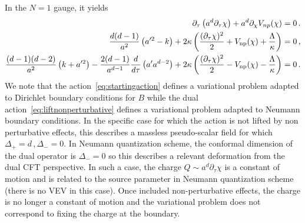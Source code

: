 \documentclass[a4paper]{article}
\begin{document}
In the $N=1$ gauge, it yields
\begin{equation}\label{eq:Nequal1gauge}
  \begin{aligned}
    \partial_\tau\left(a^d\partial_\tau \chi\right)+a^{d}\partial_{\chi}V_{np}(\chi)&=0\,.\\
    \frac{d(d-1)}{a^2}\left(a'^2-k\right)+2\kappa\left(\frac{(\partial_\tau \chi)^2}{2}+V_{\rm np}(\chi)+\frac{\Lambda}{\kappa}\right)&=0\,,\\
    \frac{(d-1)(d-2)}{a^2}\left(k+a'^2\right)-\frac{2(d-1)}{a^{d-1}}\frac{d}{d\tau}\left(a'a^{d-2}\right)+2\kappa \left(\frac{(\partial_\tau \chi)^2}{2}-V_{\rm np}(\chi)-\frac{\Lambda}{\kappa}\right)&=0\,.
  \end{aligned}
\end{equation}
We note that the action~\eqref{eq:startingaction} defines a variational problem adapted to Dirichlet boundary conditions for $B$ while the dual action~\eqref{eq:liftnonperturbative} defines a variational problem adapted to Neumann boundary conditions. In the specific case for which the action is not lifted by non perturbative effects, this describes a massless pseudo-scalar field for which $\Delta_+=d\,,\Delta_- = 0$. In Neumann quantization scheme, the conformal dimension of the dual operator is $\Delta_-=0$ so this describes a relevant deformation from the dual CFT perspective. In such a case, the charge $Q\sim a^d \partial_\tau \chi$ is a constant of motion and is related to the source parameter in Neumann quantization scheme (there is no VEV in this case). Once included non-perturbative effects, the charge is no longer a constant of motion and the variational problem does not correspond to fixing the charge at the boundary.
\end{document}
